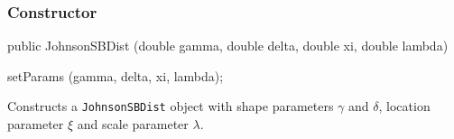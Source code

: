 \subsubsection* {Constructor}

\begin{code}

   public JohnsonSBDist (double gamma, double delta,
                         double xi, double lambda)\begin{hide} {
      setParams (gamma, delta, xi, lambda);
   }\end{hide}
\end{code}
  \begin{tabb} Constructs a \texttt{JohnsonSBDist} object
   with shape parameters $\gamma$ and $\delta$,
   location parameter $\xi$ and scale parameter $\lambda$.
  \end{tabb}

